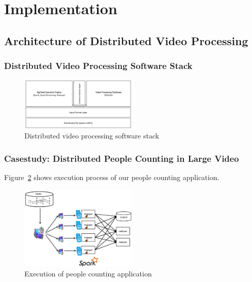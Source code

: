 \section{Implementation}
\label{sec:sec_algorithm}
\subsection{Architecture of Distributed Video Processing}

\subsubsection{Distributed Video Processing Software Stack}

\begin{figure}[htbp!]\centering
\vspace{-1ex}
\includegraphics[width=0.5\textwidth]{figures/softwarestack.pdf}
\vspace{-4ex}
\caption{Distributed video processing software stack}
\label{fig:overview}
\end{figure}

\subsubsection{Casestudy: Distributed People Counting in Large Video}

Figure~\ref{fig:overview} shows execution process of our people counting
application.

\begin{figure}[htbp!]\centering
\vspace{-1ex}
\includegraphics[width=0.5\textwidth]{figures/overview.pdf}
\vspace{-4ex}
\caption{Execution of people counting application}
\label{fig:overview}
\end{figure}

